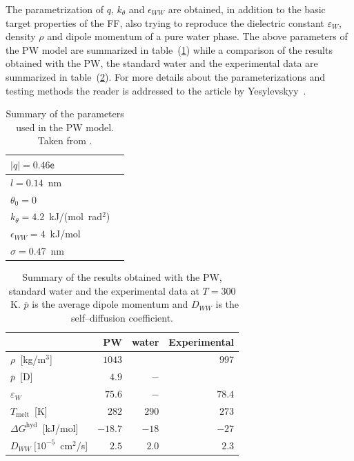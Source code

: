 The parametrization of $q$, $k_\theta$ and $\epsilon_{WW}$ are obtained, in addition to the basic target 
properties of the \martini \ac{FF}, also trying to reproduce the dielectric constant $\varepsilon_{W}$, density 
$\rho$ and dipole momentum of a pure water phase. The above parameters of the \ac{PW} model are summarized in 
table~(\ref{tab:PWParam}) while a comparison of the results obtained with the \ac{PW}, the standard \martini 
water and the experimental data are summarized in table~(\ref{tab:PWRes}). For more details about the 
parameterizations and testing methods the reader is 
addressed to the article by Yesylevskyy \etal\,\cite{PW}.
\begin{table}
	\centering
	\begin{tabular}{ll}
		\toprule
		$|q| = 0.46\mathsf{e}$				\\ \midrule
		$l = 0.14$~nm						\\ \midrule
		$\theta_0 = 0$						\\ \midrule
		$k_\theta = 4.2$~kJ/(mol\ rad$^2$)	\\ \midrule
		$\epsilon_{WW} = 4$~kJ/mol			\\ \midrule
		$\sigma = 0.47$~nm					\\ \bottomrule
	\end{tabular}
	\caption{Summary of the parameters used in the \acs{PW} model. Taken from \cite{PW}.}
	\label{tab:PWParam}
\end{table}

\begin{table}
	\centering
	\begin{tabular}{lrrr}
		\toprule
		\,	& \acs{PW} &  \martini water & Experimental \\ \toprule
		$\rho$~[kg/m$^3$]				& $1043$  &   		& $997$		\\ \midrule
		$\overline{p}$~[D] 				& $4.9$   & $-$ 	& 		    \\ \midrule
		$\varepsilon_{W}$ 				& $75.6$  & $-$ 	& $78.4$	\\ \midrule
		$T_\text{melt}$~[K] 			& $282$   & $290$ 	& $273$		\\ \midrule
		$\Delta G^\text{hyd}$~[kJ/mol] 	& $-18.7$ &	$-18$	& $-27$		\\ \midrule%
		$D_{WW}~[10^{-5}$~cm$^2$/s]		& $2.5$   & $2.0$   & $2.3$		\\ \bottomrule
	\end{tabular}
	\caption{Summary of the results obtained with the \acs{PW}, standard \martini water and the experimental data at $T=300$~K. $\overline{p}$ is the average dipole momentum and $D_{WW}$ is the self--diffusion coefficient.}
	\label{tab:PWRes}
\end{table}

